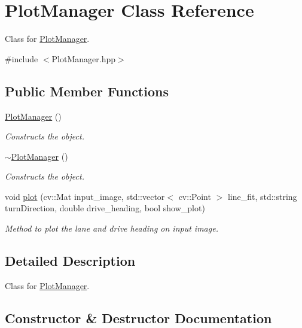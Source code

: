 \hypertarget{class_plot_manager}{}\section{Plot\+Manager Class Reference}
\label{class_plot_manager}


Class for \hyperlink{class_plot_manager}{Plot\+Manager}.  




{\ttfamily \#include $<$Plot\+Manager.\+hpp$>$}

\subsection*{Public Member Functions}
\begin{DoxyCompactItemize}
\item 
\hyperlink{class_plot_manager_a9a7b472058d22e8bbf7712686b998aae}{Plot\+Manager} ()
\begin{DoxyCompactList}\small\item\em Constructs the object. \end{DoxyCompactList}\item 
\hyperlink{class_plot_manager_ab5b318f61ab5e2c50d0bf7d09a05c331}{$\sim$\+Plot\+Manager} ()
\begin{DoxyCompactList}\small\item\em Constructs the object. \end{DoxyCompactList}\item 
void \hyperlink{class_plot_manager_a314f6e531f88366eb71c40eb84140c3e}{plot} (cv\+::\+Mat input\+\_\+image, std\+::vector$<$ cv\+::\+Point $>$ line\+\_\+fit, std\+::string turn\+Direction, double drive\+\_\+heading, bool show\+\_\+plot)
\begin{DoxyCompactList}\small\item\em Method to plot the lane and drive heading on input image. \end{DoxyCompactList}\end{DoxyCompactItemize}


\subsection{Detailed Description}
Class for \hyperlink{class_plot_manager}{Plot\+Manager}. 

\subsection{Constructor \& Destructor Documentation}
